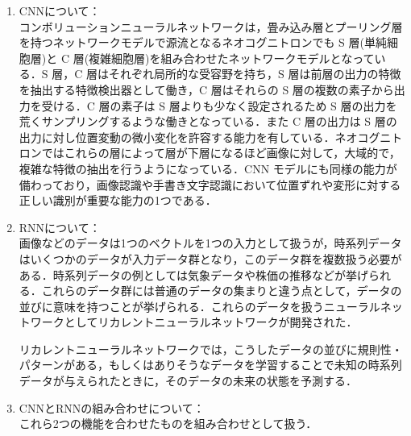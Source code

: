 \documentclass[a4paper,10pt]{jarticle}
\begin{document}
\begin{enumerate}
\item CNNについて：\\

コンボリューションニューラルネットワークは，畳み込み層とプーリング層を持つネットワークモデルで源流となるネオコグニトロンでも S 層(単純細胞層)と C 層(複雑細胞層)を組み合わせたネットワークモデルとなっている．S 層，C 層はそれぞれ局所的な受容野を持ち，S 層は前層の出力の特徴を抽出する特徴検出器として働き，C 層はそれらの S 層の複数の素子から出力を受ける．C 層の素子は S 層よりも少なく設定されるため S 層の出力を荒くサンプリングするような働きとなっている．また C 層の出力は S 層の出力に対し位置変動の微小変化を許容する能力を有している．ネオコグニトロンではこれらの層によって層が下層になるほど画像に対して，大域的で，複雑な特徴の抽出を行うようになっている．CNN モデルにも同様の能力が備わっており，画像認識や手書き文字認識において位置ずれや変形に対する正しい識別が重要な能力の1つである．

\item RNNについて：\\

画像などのデータは1つのベクトルを1つの入力として扱うが，時系列データはいくつかのデータが入力データ群となり，このデータ群を複数扱う必要がある．時系列データの例としては気象データや株価の推移などが挙げられる．これらのデータ群には普通のデータの集まりと違う点として，データの並びに意味を持つことが挙げられる．これらのデータを扱うニューラルネットワークとしてリカレントニューラルネットワークが開発された．

リカレントニューラルネットワークでは，こうしたデータの並びに規則性・パターンがある，もしくはありそうなデータを学習することで未知の時系列データが与えられたときに，そのデータの未来の状態を予測する．

\item CNNとRNNの組み合わせについて：\\
  
これら2つの機能を合わせたものを組み合わせとして扱う．

\end{enumerate}
\end{document}
